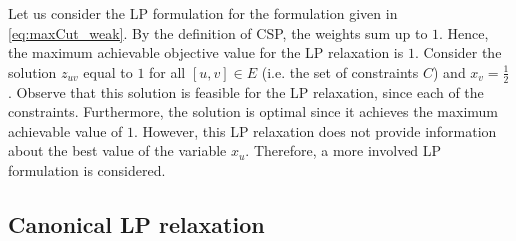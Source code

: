 Let us consider the LP formulation for the formulation given in \eqref{eq:maxCut_weak}. 
By the definition of CSP, the weights sum up to $1$. 
Hence, the maximum achievable objective value for the LP relaxation is $1$. 
Consider the solution $z_{uv}$ equal to $1$ for all $[u,v] \in E$ (i.e. the set of constraints $C$) and $x_v = \frac{1}{2}$. 
Observe that this solution is feasible for the LP relaxation, since each of the constraints. Furthermore, the solution is optimal since it achieves the maximum achievable value of $1$. 
However, this LP relaxation does not provide information about the best value of the variable $x_u$. 
Therefore, a more involved LP formulation is considered.

\subsection{Canonical LP relaxation}